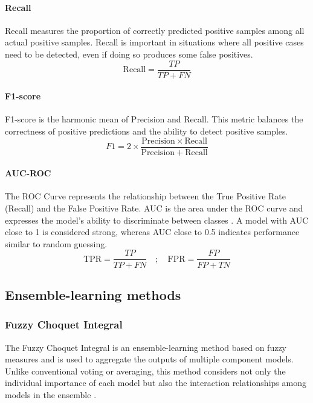 \documentclass[10pt,twoside]{article}
\begin{document}
\paragraph{Recall} 
Recall \cite{grandini_metrics_2020} measures the proportion of correctly predicted positive samples among all actual positive samples. Recall is important in situations where all positive cases need to be detected, even if doing so produces some false positives.
\begin{equation} 
\mathrm{Recall}=\frac{TP}{TP+FN}
\end{equation}
\paragraph{F1-score} 
F1-score \cite{grandini_metrics_2020} is the harmonic mean of Precision and Recall. This metric balances the correctness of positive predictions and the ability to detect positive samples.
\begin{equation} 
F1=2\times\frac{\mathrm{Precision}\times\mathrm{Recall}}{\mathrm{Precision}+\mathrm{Recall}}
\end{equation}
\paragraph{AUC-ROC} 
The ROC Curve represents the relationship between the True Positive Rate (Recall) and the False Positive Rate. AUC is the area under the ROC curve and expresses the model's ability to discriminate between classes \cite{fawcett_introduction_2006}. A model with AUC close to 1 is considered strong, whereas AUC close to 0.5 indicates performance similar to random guessing.
\begin{equation} 
\mathrm{TPR}=\frac{TP}{TP+FN}\quad;\quad \mathrm{FPR}=\frac{FP}{FP+TN}
\end{equation}


\subsection{Ensemble-learning methods}

\subsubsection{Fuzzy Choquet Integral}
The Fuzzy Choquet Integral is an ensemble-learning method based on fuzzy measures and is used to aggregate the outputs of multiple component models. Unlike conventional voting or averaging, this method considers not only the individual importance of each model but also the interaction relationships among models in the ensemble \cite{zadeh_fuzzy_1965, choquet_theory_1954}.
\end{document}
